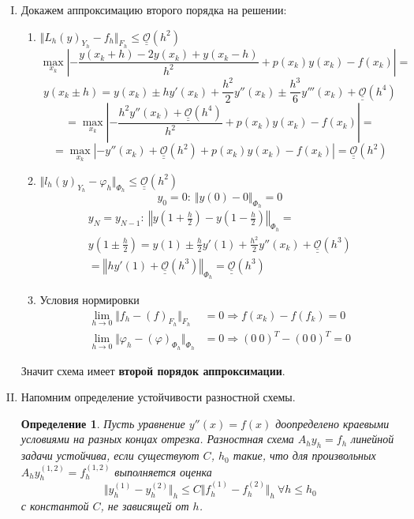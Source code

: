 \documentclass[12pt]{article}
\newtheorem*{definition}{Определение}
\def\bigO{ \underline{\underline{\mathcal{O}}} }
\begin{document}
    \newpage

    \begin{enumerate}[I.]
        \item Докажем аппроксимацию второго порядка на решении:
        \begin{enumerate}
            \item $\Vert L_h(y)_{Y_h}-f_h\Vert_{F_h}\leq\bigO(h^2)$
            \[\max_{x_k}\left|-\frac{y(x_k+h)-2y(x_k)+y(x_k-h)}{h^2}+p(x_k)y(x_k)-f(x_k)\right|=\]
            \[y(x_k\pm h)=y(x_k)\pm hy'(x_k)+\frac{h^2}{2}y''(x_k)\pm\frac{h^3}{6}y'''(x_k)+\bigO(h^4)\]
            \[=\max_{x_k}\left|-\frac{h^2y''(x_k)+\bigO(h^4)}{h^2}+p(x_k)y(x_k)-f(x_k)\right|=\]
            \[=\max_{x_k}\left|-y''(x_k)+\bigO(h^2)+p(x_k)y(x_k)-f(x_k)\right|=\bigO(h^2)\]
            \item $\Vert l_h(y)_{Y_h}-\varphi_h\Vert_{\Phi_h}\leq\bigO(h^2)$
                \[y_0 = 0:\ \Vert y(0)-0\Vert_{\Phi_h}=0\]
                \begin{multline*}
                    y_N = y_{N-1}:\ \left\Vert y\left(1+\frac{h}{2}\right)-y\left(1-\frac{h}{2}\right)\right\Vert_{\Phi_h}= \\
                    y\left(1\pm \frac{h}{2}\right)=y(1)\pm \frac{h}{2}y'(1)+\frac{h^2}{2}y''(x_k)+\bigO(h^3) \\
                    =\left\Vert hy'(1)+\bigO(h^3)\right\Vert_{\Phi_h}=\bigO(h^3)
                \end{multline*}
            \item Условия нормировки
            \begin{align*}
                \lim_{h\rightarrow0}\Vert f_h-(f)_{F_h}\Vert_{F_h}&=0 \Rightarrow f(x_k)-f(f_k) = 0\\
                \lim_{h\rightarrow0}\Vert \varphi_h-(\varphi)_{\Phi_h}\Vert_{\Phi_h}&=0 \Rightarrow (0\ 0)^T - (0\ 0)^T = 0
            \end{align*}
        \end{enumerate}
        Значит схема имеет \textbf{второй порядок аппроксимации}.
        \newpage

        \item Напомним определение устойчивости разностной схемы.
        \begin{definition}
            Пусть уравнение $y''(x)=f(x)$ доопределено краевыми
            условиями на разных концах отрезка. Разностная схема
            $A_hy_h = f_h$ линейной задачи устойчива, если существуют $C$, $h_0$ такие, что для
            произвольных $A_hy^{(1,2)}_h = f^{(1,2)}_h$ выполняется оценка
            \[\Vert y^{(1)}_h-y^{(2)}_h\Vert_h\leq C\Vert f^{(1)}_h -f^{(2)}_h\Vert_h\ \forall h\leq h_0\]
            с константой $C$, не зависящей от $h$.
        \end{definition}


\end{enumerate}
\end{document}
